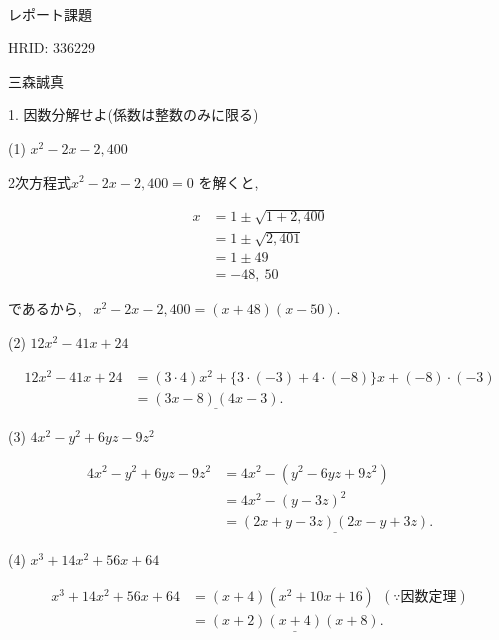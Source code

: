 \documentclass[dvipdfmx]{jsarticle}
\begin{document}
\begin{center}
 \ 
 
\vspace{15zw}
  {\HUGE レポート課題}
  
\vspace{3zw}
{\huge HRID: 336229}

\bigskip

{\huge 三森誠真}

\end{center}
\newpage

1. 因数分解せよ(係数は整数のみに限る)

(1) $x^2 - 2x -2{,}400$

2次方程式$x^2 - 2x -2{,}400 = 0$ を解くと, \ 

$$
\begin{aligned}
  x &= 1 \pm \sqrt{1 + 2{,}400} \\
  &= 1 \pm \sqrt{2{,}401} \\
  &= 1 \pm 49 \\
  &= -48, \ 50
\end{aligned}
$$

であるから, \ \underline{$x^2 - 2x -2{,}400 = (x + 48)(x - 50).$}

\bigskip

(2) $12x^2 -41x + 24$

$$
\begin{aligned}
  12x^2 -41x + 24 
  &= (3 \cdot 4)x^2 +\{3\cdot(-3) + 4\cdot(-8)\}x + (-8)\cdot(-3) \\
  &= \underline{(3x - 8)(4x - 3)}.
\end{aligned}
$$

\bigskip

(3) $4x^2 - y^2 + 6yz - 9z^2$

$$
\begin{aligned}
  4x^2 - y^2 + 6yz - 9z^2
  &= 4x^2 - (y^2 - 6yz + 9z^2) \\
  &= 4x^2 - (y-3z)^2 \\
  &= \underline{(2x + y - 3z)(2x - y + 3z)}.
\end{aligned}
$$

\bigskip

(4) $x^3 + 14x^2 + 56x + 64$

$$
\begin{aligned}
  x^3 + 14x^2 + 56x + 64
  &= (x+4)(x^2 + 10x + 16) \ \ (\because 因数定理) \\
  &= \underline{(x+2)(x+4)(x+8)}.
\end{aligned}
$$
\end{document}
